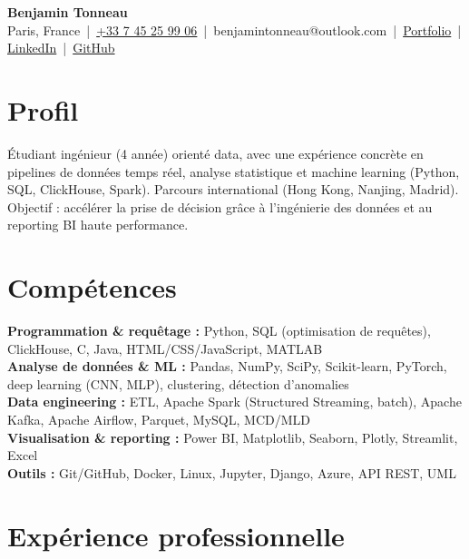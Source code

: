 \documentclass[10pt,a4paper]{article}
\newcommand{\secgap}{\vspace{3.5pt plus 1.5pt minus 1pt}}
\begin{document}
\enlargethispage{2cm}

\begin{center}
  {\LARGE \textbf{Benjamin Tonneau}}\\[2.5pt]
  Paris, France \,|\, \href{tel:+33745259906}{+33 7 45 25 99 06} \,|\, benjamintonneau@outlook.com \,|\, \href{https://tonneaubenjamin.github.io/Portfolio-Benjamin-Tonneau/}{Portfolio} \,|\, \href{https://linkedin.com/in/benjamin-tonneau}{LinkedIn} \,|\, \href{https://github.com/TonneauBenjamin}{GitHub}
\end{center}

\secgap
\section{Profil}
Étudiant ingénieur (4\ieme{} année) orienté data, avec une expérience concrète en pipelines de données temps réel, analyse statistique et machine learning (Python, SQL, ClickHouse, Spark). Parcours international (Hong Kong, Nanjing, Madrid). Objectif : accélérer la prise de décision grâce à l'ingénierie des données et au reporting BI haute performance.

\secgap
\section{Compétences}
\textbf{Programmation \& requêtage :} Python, SQL (optimisation de requêtes), ClickHouse, C, Java, HTML/CSS/JavaScript, MATLAB\\[1.5pt]
\textbf{Analyse de données \& ML :} Pandas, NumPy, SciPy, Scikit-learn, PyTorch, deep learning (CNN, MLP), clustering, détection d'anomalies\\[1.5pt]
\textbf{Data engineering :} ETL, Apache Spark (Structured Streaming, batch), Apache Kafka, Apache Airflow, Parquet, MySQL, MCD/MLD\\[1.5pt]
\textbf{Visualisation \& reporting :} Power BI, Matplotlib, Seaborn, Plotly, Streamlit, Excel\\[1.5pt]
\textbf{Outils :} Git/GitHub, Docker, Linux, Jupyter, Django, Azure, API REST, UML

\secgap
\section{Expérience professionnelle}
\end{document}

